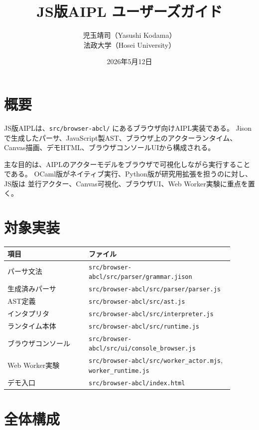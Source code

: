 \documentclass[11pt,a4paper,uplatex,dvipdfmx]{jsarticle}
\title{JS版AIPL ユーザーズガイド}
\author{児玉靖司（Yasushi Kodama）\\法政大学（Hosei University）}
\date{2026年5月12日}
\begin{document}
\maketitle
\tableofcontents
\newpage

\section{概要}

JS版AIPLは、\texttt{src/browser-abcl/} にあるブラウザ向けAIPL実装である。
Jisonで生成したパーサ、JavaScript製AST、ブラウザ上のアクターランタイム、
Canvas描画、デモHTML、ブラウザコンソールUIから構成される。

主な目的は、AIPLのアクターモデルをブラウザで可視化しながら実行することである。
OCaml版がネイティブ実行、Python版が研究用拡張を担うのに対し、JS版は
並行アクター、Canvas可視化、ブラウザUI、Web Worker実験に重点を置く。

\section{対象実装}

\begin{longtable}{p{0.32\linewidth}p{0.58\linewidth}}
\toprule
項目 & ファイル \\
\midrule
パーサ文法 & \texttt{src/browser-abcl/src/parser/grammar.jison} \\
生成済みパーサ & \texttt{src/browser-abcl/src/parser/parser.js} \\
AST定義 & \texttt{src/browser-abcl/src/ast.js} \\
インタプリタ & \texttt{src/browser-abcl/src/interpreter.js} \\
ランタイム本体 & \texttt{src/browser-abcl/src/runtime.js} \\
ブラウザコンソール & \texttt{src/browser-abcl/src/ui/console\_browser.js} \\
Web Worker実験 & \texttt{src/browser-abcl/src/worker\_actor.mjs}, \texttt{worker\_runtime.js} \\
デモ入口 & \texttt{src/browser-abcl/index.html} \\
\bottomrule
\end{longtable}

\section{全体構成}
\end{document}
